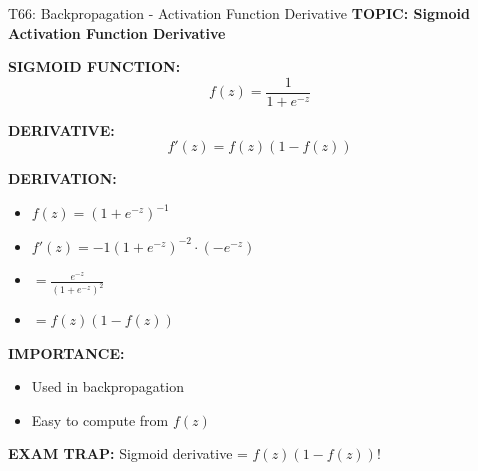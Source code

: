 \documentclass[8pt]{beamer}
\begin{document}
	\begin{frame}{T66: Backpropagation - Activation Function Derivative}
		\fontsize{6.5}{7.5}\selectfont
		\textbf{TOPIC: Sigmoid Activation Function Derivative}
		
		\vspace{0.1cm}
		\textbf{SIGMOID FUNCTION:}
		\[
		f(z) = \frac{1}{1 + e^{-z}}
		\]
		
		\vspace{0.1cm}
		\textbf{DERIVATIVE:}
		\[
		f'(z) = f(z)(1 - f(z))
		\]
		
		\vspace{0.1cm}
		\textbf{DERIVATION:}
		\begin{itemize}
			\item $f(z) = (1 + e^{-z})^{-1}$
			\item $f'(z) = -1(1 + e^{-z})^{-2} \cdot (-e^{-z})$
			\item $= \frac{e^{-z}}{(1 + e^{-z})^2}$
			\item $= f(z)(1 - f(z))$
		\end{itemize}
		
		\vspace{0.1cm}
		\textbf{IMPORTANCE:}
		\begin{itemize}
			\item Used in backpropagation
			\item Easy to compute from $f(z)$
		\end{itemize}
		
		\textcolor{myred}{\textbf{EXAM TRAP:}} Sigmoid derivative = \textcolor{myblue}{$f(z)(1-f(z))$}!
	\end{frame}
	
\end{document}
